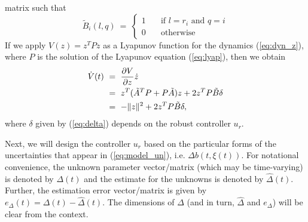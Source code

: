 \documentclass[twoside,leqno,onecolumn]{article}
\begin{document}
matrix such that
\[ \tilde{B}_i(l,q) ~=~ \left\{ \begin{array}{lll}
         1 & \quad\mbox{if $l = r_i$ and $q = i$}\\
         0  & \quad\mbox{otherwise}\end{array} \right. \]
If we apply $V(z)=z^TPz$ as a Lyapunov function for the dynamics
(\ref{eq:dyn_z}), where $P$ is the solution of the Lyapunov
equation (\ref{eq:lyap}), then we obtain
\begin{align}
\label{eq:general}
\dot{V}(t)&~=~\frac{\partial V}{\partial z}\dot{z}\notag\\
&~=~z^T(\tilde A^T P + P \tilde A)z + 2 z^T P \tilde B \delta\notag\\
&~=~-\|z\|^2 + 2 z^T P \tilde B \delta,
\end{align}
where $\delta$ given by (\ref{eq:delta}) depends on the robust
controller $u_r$.

Next, we will design the controller $u_{r}$ based on the
particular forms of the uncertainties that appear in
(\ref{eq:model_un}), i.e. $\Delta b(t,\xi(t))$. For notational
convenience, the unknown parameter vector/matrix (which may be
time-varying) is denoted by $\Delta(t)$ and the estimate for the
unknowns is denoted by $\widehat{\Delta}(t)$. Further, the
estimation error vector/matrix is given by $e_\Delta(t) =
\Delta(t)-\widehat{\Delta}(t)$. The dimensions of $\Delta$ (and in
turn, $\widehat{\Delta}$ and $e_\Delta$) will be clear from the
context.
\end{document}
